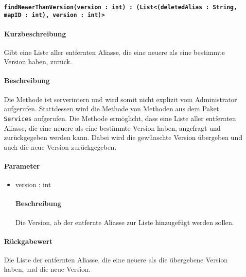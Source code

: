 \paragraph{\texttt{findNewerThanVersion(version : int) : (List<(deletedAlias : String, mapID : int), version : int)>}}%
\paragraph*{Kurzbeschreibung}
Gibt eine Liste aller entfernten Aliasse, die eine neuere als eine bestimmte Version haben, zurück.
\paragraph*{Beschreibung}
Die Methode ist serverintern und wird somit nicht explizit vom Administrator aufgerufen.
Stattdessen wird die Methode von Methoden aus dem Paket \texttt{Services} aufgerufen.
Die Methode ermöglicht, dass eine Liste aller entfernten Aliasse, die eine neuere als eine bestimmte Version haben, angefragt und zurückgegeben werden kann.
Dabei wird die gewünschte Version übergeben und auch die neue Version zurückgegeben.
\paragraph*{Parameter}
\begin{itemize}
    \item version : int
    		\paragraph*{Beschreibung}
    		Die Version, ab der entfernte Aliasse zur Liste hinzugefügt werden sollen.
\end{itemize}
\paragraph*{Rückgabewert}
Die Liste der entfernten Aliasse, die eine neuere als die übergebene Version haben, und die neue Version.
